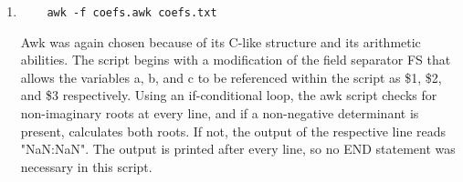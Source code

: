 \documentclass{article}
\begin{document}
\begin{enumerate}
\begin{enumerate}
		\item	\begin{verbatim}	awk -f coefs.awk coefs.txt	\end{verbatim}
			

	Awk was again chosen because of its C-like structure and its arithmetic abilities. The script begins with a modification of the field separator FS that allows the variables a, b, and c to be referenced within the script as \$1, \$2, and \$3 respectively. Using an if-conditional loop, the awk script checks for non-imaginary roots at every line, and if a non-negative determinant is present, calculates both roots. If not, the output of the respective line reads "NaN:NaN". The output is printed after every line, so no END statement was necessary in this script.

	\end{enumerate}

\end{enumerate}
\end{document}
